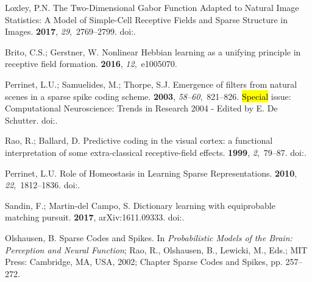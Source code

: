 \documentclass[vision,article,accept,oneauthor,pdftex]{Definitions/mdpi}
\begin{document}
\begin{thebibliography}{999}
Loxley, P.N.
\newblock The Two-Dimensional Gabor Function Adapted to Natural Image
  Statistics: A Model of Simple-Cell Receptive Fields and Sparse Structure in
  Images.
 {\bf 2017}, {\em 29},~2769--2799.
\newblock
  doi:{\href{https://doi.org/10.1162/neco_a_00997}{}}.

Brito, C.S.; Gerstner, W.
\newblock Nonlinear Hebbian learning as a unifying principle in receptive field
  formation.
 {\bf 2016}, {\em 12},~e1005070.

Perrinet, L.U.; Samuelides, M.; Thorpe, S.J.
\newblock Emergence of filters from natural scenes in a sparse spike coding
  scheme.
 {\bf 2003}, {\em 58--60},~821--826.
\newblock \hl{Special} issue: Computational Neuroscience: Trends in Research 2004 -
  Edited by E. De Schutter.
  doi:{\href{https://doi.org/10.1016/j.neucom.2004.01.133}{}}.

Rao, R.; Ballard, D.
\newblock Predictive coding in the visual cortex: a functional interpretation
  of some extra-classical receptive-field effects.
 {\bf 1999}, {\em 2},~79--87.
\newblock
  doi:{\href{https://doi.org/10.1038/4580}{}}.

Perrinet, L.U.
\newblock Role of Homeostasis in Learning Sparse Representations.
 {\bf 2010}, {\em 22},~1812--1836.
\newblock
  doi:{\href{https://doi.org/10.1162/neco.2010.05-08-795}{}}.

Sandin, F.; Martin-del Campo, S.
\newblock Dictionary learning with equiprobable matching pursuit.
 {\bf 2017}, arXiv:1611.09333.
\newblock
  doi:{\href{https://doi.org/10.1109/IJCNN.2017.7965902}{}}.

Olshausen, B.
\newblock Sparse Codes and Spikes. In {\em Probabilistic {M}odels of the
  {B}rain: {P}erception and {N}eural {F}unction}; Rao, R., Olshausen, B.,
  Lewicki, M., Eds.; MIT Press: Cambridge, MA, USA,  2002; Chapter Sparse Codes and Spikes, pp.
  257--272.


\end{thebibliography}
\end{document}
